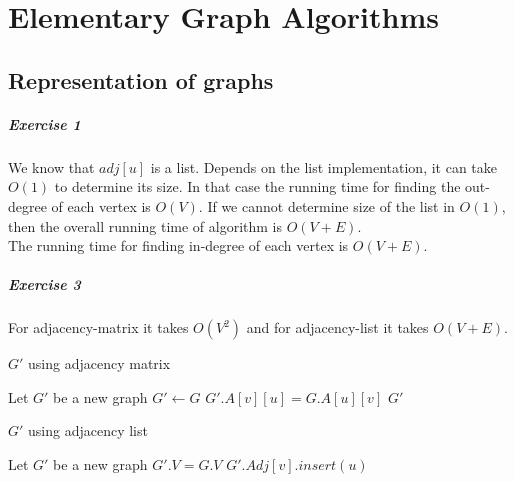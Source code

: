 \documentclass{book}
\begin{document}
	\chapter{Elementary Graph Algorithms}
	\section{Representation of graphs}
	\label{sec:Representation of graphs}
	\paragraph{Exercise 1}
	We know that $adj[u]$ is a list. Depends on the list implementation, it can take $O(1)$ to determine its size. In that case the running time for finding the out-degree of each vertex is $O(V)$. If we cannot determine size of the list in $O(1)$, then the overall running time of algorithm is $O(V + E)$. \\
	The running time for finding in-degree of each vertex is $O(V + E)$.
	\paragraph{Exercise 3}
	For adjacency-matrix it takes $O(V^2)$ and for adjacency-list it takes $O(V + E)$.
	\begin{algorithm}[h!]
		\caption{$G'$ using adjacency matrix}
		\begin{algorithmic}[1]
				\State Let $G'$ be a new graph
				\State $G' \gets G$
						\State $G'.A[v][u] = G.A[u][v]$
					\EndFor
				\EndFor
				\State \Return $G'$
			\EndFunction
		\end{algorithmic}
	\end{algorithm}
	\begin{algorithm*}[h!]
		\caption{$G'$ using adjacency list}
		\begin{algorithmic}[1]
				\State Let $G'$ be a new graph
				\State $G'.V = G.V$
						\State $G'.Adj[v].insert(u)$
					\EndFor
				\EndFor
			\EndFunction
		\end{algorithmic}
	\end{algorithm*}
	\FloatBarrier
\end{document}
